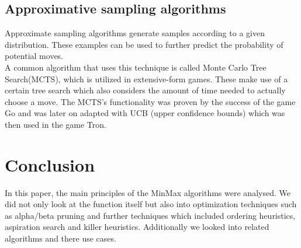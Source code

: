 \documentclass[conference,pdf,table,xcdraw, utf8]{IEEEtran}
\begin{document}
\subsection{Approximative sampling algorithms}
Approximate sampling algorithms generate samples according to a given distribution. These examples can be used to further predict the probability of potential moves. \cite{spyridon2005sampling-approximation}
\\
A common algorithm that uses this technique is called Monte Carlo Tree Search(MCTS), which is utilized in extensive-form games. \cite{branislav2016algorithms} These make use of a certain tree search which also considers the amount of time needed to actually choose a move.
The MCTS's functionality was proven by the success of the game Go and was later on adapted with UCB (upper confidence bounds) which was then used in the game Tron. \cite{spyridon2010uctAgentTron}





\vspace{1em}
\section{Conclusion}
In this paper, the main principles of the MinMax algorithms were analysed. We did not only look at the function itself but also into optimization techniques such as alpha/beta pruning and further techniques which included ordering heuristics, aspiration search and killer heuristics. Additionally we looked into related algorithms and there use cases.


\clearpage



\end{document}
